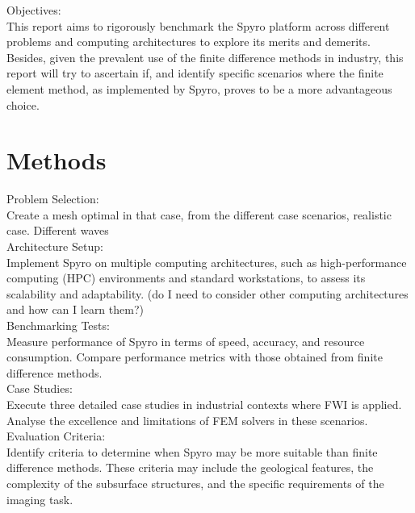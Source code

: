 \documentclass[project-plan]{report-template}
\begin{document}
Objectives: \\
This report aims to rigorously benchmark the Spyro platform across different problems and computing architectures to explore its merits and demerits. Besides, given the prevalent use of the finite difference methods in industry, this report will try to ascertain if, and identify specific scenarios where the finite element method, as implemented by Spyro, proves to be a more advantageous choice.


\section{Methods}
Problem Selection: \\
Create a mesh optimal in that case, from the different case scenarios, realistic case. Different waves  \\
Architecture Setup: \\
Implement Spyro on multiple computing architectures, such as high-performance computing (HPC) environments and standard workstations, to assess its scalability and adaptability. (do I need to consider other computing architectures and how can I learn them?) \\
Benchmarking Tests: \\
Measure performance of Spyro in terms of speed, accuracy, and resource consumption. Compare performance metrics with those obtained from finite difference methods. \\
Case Studies: \\
Execute three detailed case studies in industrial contexts where FWI is applied. Analyse the excellence and limitations of FEM solvers in these scenarios. \\
Evaluation Criteria: \\
Identify criteria to determine when Spyro may be more suitable than finite difference methods. These criteria may include the geological features, the complexity of the subsurface structures, and the specific requirements of the imaging task. \\



\end{document}
